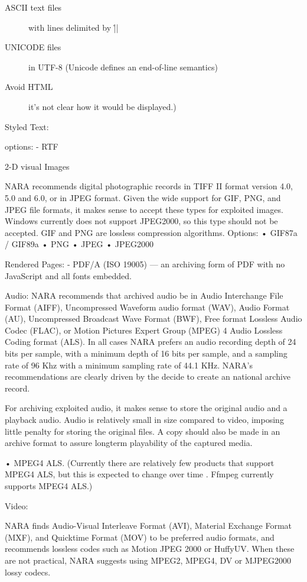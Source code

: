 \documentclass[11pt,letter]{article}
\begin{document}
\begin{description}
\item[ASCII text files] with lines delimited by |\r\n|
\item[UNICODE files] in UTF-8	(Unicode defines an end-of-line semantics)
\item[Avoid HTML] it’s not clear how it would be displayed.)
\end{description}

Styled Text:

options:
- RTF

2-D visual Images 

NARA recommends digital photographic records in TIFF II format version 4.0, 5.0 and 6.0, or in JPEG format. 
Given the wide support for GIF, PNG, and JPEG file formats, it makes sense to accept these types for exploited images. Windows currently does not support JPEG2000, so this type should not be accepted. GIF and PNG are lossless compression algorithms.
Options:
•	GIF87a / GIF89a
•	PNG
•	JPEG
•	JPEG2000


Rendered Pages:
- PDF/A (ISO 19005)  	— an archiving form of PDF with no JavaScript and all fonts embedded.



Audio:
NARA recommends that archived audio be in Audio Interchange File Format (AIFF), Uncompressed Waveform audio format (WAV), Audio Format (AU), Uncompressed Broadcast Wave Format (BWF), Free format Lossless Audio Codec (FLAC), or Motion Pictures Expert Group (MPEG) 4 Audio Lossless Coding format (ALS). In all cases NARA prefers an audio recording depth of 24 bits per sample, with a minimum depth of 16 bits per sample, and a sampling rate of 96 Khz with a minimum sampling rate of 44.1 KHz.  NARA’s recommendations are clearly driven by the decide to create an national archive record. 

For archiving exploited audio, it makes sense to store the original audio and a playback audio. Audio is relatively small in size compared to video, imposing little penalty for storing the original files. A copy should also be made in an archive format to assure longterm playability of the captured media. 

•	MPEG4 ALS. (Currently there are relatively few products that support MPEG4 ALS, but this is expected to change over time
. Ffmpeg currently supports MPEG4 ALS.)

Video:

NARA finds Audio-Visual Interleave Format (AVI), Material Exchange Format (MXF), and Quicktime Format (MOV) to be preferred audio formats, and recommends lossless codes such as Motion JPEG 2000 or HuffyUV. When these are not practical, NARA suggests using MPEG2, MPEG4, DV or MJPEG2000 lossy codecs.
\end{document}
